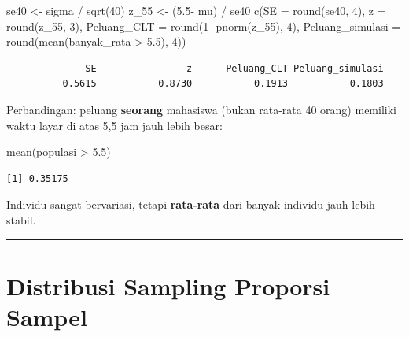 \documentclass[
  indonesian,
  letterpaper,
]{book}
\newenvironment{Shaded}{\begin{snugshade}}{\end{snugshade}}
\newcommand{\AttributeTok}[1]{\textcolor[rgb]{0.40,0.45,0.13}{#1}}
\newcommand{\DecValTok}[1]{\textcolor[rgb]{0.68,0.00,0.00}{#1}}
\newcommand{\FloatTok}[1]{\textcolor[rgb]{0.68,0.00,0.00}{#1}}
\newcommand{\FunctionTok}[1]{\textcolor[rgb]{0.28,0.35,0.67}{#1}}
\newcommand{\NormalTok}[1]{\textcolor[rgb]{0.00,0.23,0.31}{#1}}
\newcommand{\OtherTok}[1]{\textcolor[rgb]{0.00,0.23,0.31}{#1}}
\newcommand{\SpecialCharTok}[1]{\textcolor[rgb]{0.37,0.37,0.37}{#1}}
\begin{document}
\begin{Shaded}
\begin{Highlighting}[]
\NormalTok{se40 }\OtherTok{\textless{}{-}}\NormalTok{ sigma }\SpecialCharTok{/} \FunctionTok{sqrt}\NormalTok{(}\DecValTok{40}\NormalTok{)}
\NormalTok{z\_55 }\OtherTok{\textless{}{-}}\NormalTok{ (}\FloatTok{5.5}\SpecialCharTok{{-}}\NormalTok{ mu) }\SpecialCharTok{/}\NormalTok{ se40}
\FunctionTok{c}\NormalTok{(}\AttributeTok{SE =} \FunctionTok{round}\NormalTok{(se40, }\DecValTok{4}\NormalTok{), }\AttributeTok{z =} \FunctionTok{round}\NormalTok{(z\_55, }\DecValTok{3}\NormalTok{),}
\AttributeTok{Peluang\_CLT =} \FunctionTok{round}\NormalTok{(}\DecValTok{1}\SpecialCharTok{{-}} \FunctionTok{pnorm}\NormalTok{(z\_55), }\DecValTok{4}\NormalTok{),}
\AttributeTok{Peluang\_simulasi =} \FunctionTok{round}\NormalTok{(}\FunctionTok{mean}\NormalTok{(banyak\_rata }\SpecialCharTok{\textgreater{}} \FloatTok{5.5}\NormalTok{), }\DecValTok{4}\NormalTok{))}
\end{Highlighting}
\end{Shaded}

\begin{verbatim}
              SE                z      Peluang_CLT Peluang_simulasi 
          0.5615           0.8730           0.1913           0.1803 
\end{verbatim}

Perbandingan: peluang \textbf{seorang} mahasiswa (bukan rata-rata 40
orang) memiliki waktu layar di atas 5,5 jam jauh lebih besar:

\begin{Shaded}
\begin{Highlighting}[]
\FunctionTok{mean}\NormalTok{(populasi }\SpecialCharTok{\textgreater{}} \FloatTok{5.5}\NormalTok{)}
\end{Highlighting}
\end{Shaded}

\begin{verbatim}
[1] 0.35175
\end{verbatim}

Individu sangat bervariasi, tetapi \textbf{rata-rata} dari banyak
individu jauh lebih stabil.

\begin{center}\rule{0.5\linewidth}{0.5pt}\end{center}


\chapter{Distribusi Sampling Proporsi
Sampel}\label{distribusi-sampling-proporsi-sampel}
\end{document}
